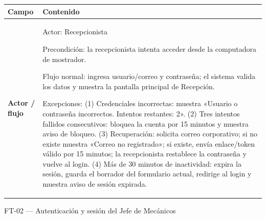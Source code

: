 {\def\LTcaptype{none} %
\begin{longtable}[]{@{}
  >{\raggedright\arraybackslash}p{}
  >{\raggedright\arraybackslash}p{}@{}}
\toprule\noalign{}
\begin{minipage}[b]{\linewidth}\raggedright
\textbf{Campo}
\end{minipage} & \begin{minipage}[b]{\linewidth}\raggedright
\textbf{Contenido}
\end{minipage} \\
\midrule\noalign{}
\endhead
\bottomrule\noalign{}
\endlastfoot
\textbf{Actor / flujo} & Actor: Recepcionista

Precondición: la recepcionista intenta acceder desde la computadora de
mostrador.

Flujo normal: ingresa usuario/correo y contraseña; el sistema valida los
datos y muestra la pantalla principal de Recepción.

Excepciones: (1) Credenciales incorrectas: muestra «Usuario o contraseña
incorrectos. Intentos restantes: 2». (2) Tres intentos fallidos
consecutivos: bloquea la cuenta por 15 minutos y muestra aviso de
bloqueo. (3) Recuperación: solicita correo corporativo; si no existe
muestra «Correo no registrado»; si existe, envía enlace/token válido por
15 minutos; la recepcionista restablece la contraseña y vuelve al login.
(4) Más de 30 minutos de inactividad: expira la sesión, guarda el
borrador del formulario actual, redirige al login y muestra aviso de
sesión expirada. \\
\end{longtable}
}

FT-02 --- Autenticación y sesión del Jefe de Mecánicos

